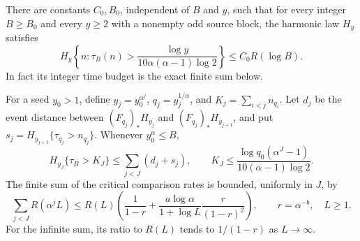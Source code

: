 \begin{proposition}
\label{prop:Mazur-critical-iteration}
There are constants \(C_0,B_0\), independent of \(B\) and \(y\),
such that for every integer \(B\ge B_0\) and every \(y\ge2\)
with a nonempty odd source block, the harmonic law \(H_y\) satisfies
\begin{equation}
 H_y\left\{n:\tau_B(n)>
 \frac{\log y}{10\alpha(\alpha-1)\log2}\right\}
 \le C_0 R(\log B).
 \label{eq:Mazur-harmonic-timed}
\end{equation}
In fact its integer time budget is the exact finite sum below.

For a seed \(y_0>1\), define
\(y_j=y_0^{\alpha^j}\), \(q_j=y_j^{1/\alpha}\), and
\(K_j=\sum_{i<j}n_{q_i}\). Let \(d_j\) be the event distance
between \((F_{q_j})_*H_{y_j}\) and
\((F_{q_j})_*H_{y_{j+1}}\), and put
\(s_j=H_{y_{j+1}}\{\tau_{q_j}>n_{q_j}\}\).
Whenever \(y_0^\alpha\le B\),
\begin{equation}
 H_{y_J}\{\tau_B>K_J\}\le\sum_{j<J}(d_j+s_j),\qquad
 K_J\le\frac{\log q_0(\alpha^J-1)}
                   {10(\alpha-1)\log2}.
 \label{eq:Mazur-timed-telescope}
\end{equation}
The finite sum of the critical comparison rates is bounded, uniformly
in \(J\), by
\begin{equation}
 \sum_{j<J}R(\alpha^j L)
 \le R(L)\left(\frac1{1-r}
       +\frac{a\log\alpha}{1+\log L}\frac r{(1-r)^2}\right),
 \qquad r=\alpha^{-b},\quad L\ge1.
 \label{eq:Mazur-critical-geometric}
\end{equation}
For the infinite sum, its ratio to \(R(L)\) tends to \(1/(1-r)\)
as \(L\to\infty\).
\end{proposition}
